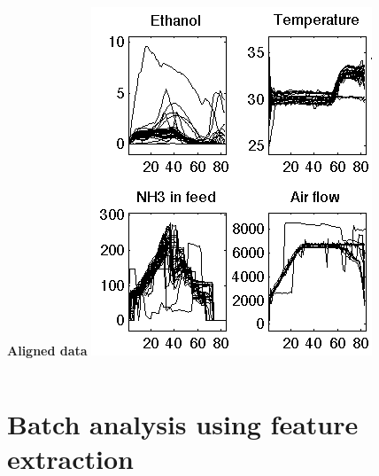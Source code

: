 \documentclass[handout, 12pt]{beamer}
\begin{document}
\begin{frame}
\begin{columns}
			\alert{\textbf{Aligned data}}
			\vfill
			\includegraphics[height=0.8\textheight]{images/aligned-trajectories-many-batches-yeast.png}
	\end{columns}
\end{frame}

\section{Batch analysis using feature extraction}
\end{document}
